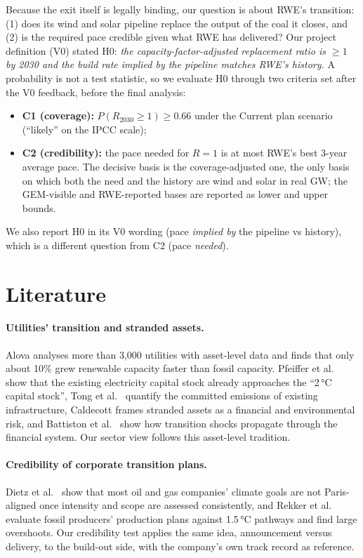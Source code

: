 \documentclass[11pt,a4paper]{article}
\begin{document}
Because the exit itself is legally binding, our question is about RWE's transition: (1) does its wind and solar pipeline replace the output of the coal it closes, and (2) is the required pace credible given what RWE has delivered? Our project definition (V0) stated H0: \emph{the capacity-factor-adjusted replacement ratio is $\geq 1$ by 2030 and the build rate implied by the pipeline matches RWE's history.} A probability is not a test statistic, so we evaluate H0 through two criteria set after the V0 feedback, before the final analysis:
\begin{itemize}
\item \textbf{C1 (coverage):} $P(R_{2030}\geq1)\geq0.66$ under the Current plan scenario (``likely'' on the IPCC scale);
\item \textbf{C2 (credibility):} the pace needed for $R=1$ is at most RWE's best 3-year average pace. The decisive basis is the coverage-adjusted one, the only basis on which both the need and the history are wind and solar in real GW; the GEM-visible and RWE-reported bases are reported as lower and upper bounds.
\end{itemize}
We also report H0 in its V0 wording (pace \emph{implied by} the pipeline vs history), which is a different question from C2 (pace \emph{needed}).

\section{Literature}
\paragraph{Utilities' transition and stranded assets.} Alova \cite{alova2020} analyses more than 3,000 utilities with asset-level data and finds that only about 10\% grew renewable capacity faster than fossil capacity. Pfeiffer et al.\ \cite{pfeiffer2016} show that the existing electricity capital stock already approaches the ``2\,°C capital stock'', Tong et al.\ \cite{tong2019} quantify the committed emissions of existing infrastructure, Caldecott \cite{caldecott2017} frames stranded assets as a financial and environmental risk, and Battiston et al.\ \cite{battiston2017} show how transition shocks propagate through the financial system. Our sector view follows this asset-level tradition.

\paragraph{Credibility of corporate transition plans.} Dietz et al.\ \cite{dietz2021} show that most oil and gas companies' climate goals are not Paris-aligned once intensity and scope are assessed consistently, and Rekker et al.\ \cite{rekker2023} evaluate fossil producers' production plans against 1.5\,°C pathways and find large overshoots. Our credibility test applies the same idea, announcement versus delivery, to the build-out side, with the company's own track record as reference.
\end{document}
